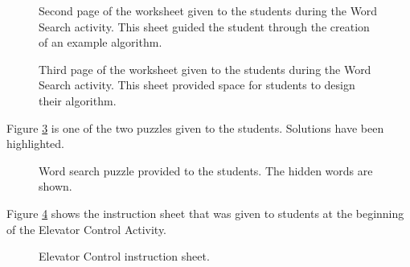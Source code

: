 \begin{figure}%
   \centering
   \caption{Second page of the worksheet given to the students during the Word Search activity. This sheet guided the student through the creation of an example algorithm.}
   \label{fig:StudentWorksheet2}
\end{figure}
	
\begin{figure}%
   \centering
   \caption{Third page of the worksheet given to the students during the Word Search activity. This sheet provided space for students to design their algorithm.}
   \label{fig:StudentWorksheet3}
\end{figure}

	\label{sec:wordsearchpuzzle}
	Figure \ref{fig:wordsearch-puzzle} is one of the two puzzles given to the students. Solutions have been highlighted.
	
	
	\begin{figure}%
   	\centering
   	\caption{Word search puzzle provided to the students. The hidden words are shown.}
   	\label{fig:wordsearch-puzzle}
	\end{figure}
	



	\label{sec:elevator_handout}
	Figure \ref{fig:elevator-instructions} shows the instruction sheet that was given to students at the beginning of the Elevator Control Activity.
	
	\begin{figure}%
   	\centering
   	\caption{Elevator Control instruction sheet.}
   	\label{fig:elevator-instructions}
	\end{figure}


